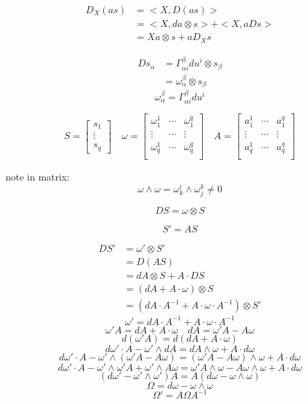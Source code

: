 \documentclass[12pt,a4paper]{article}
\begin{document}
\begin{align*}
D_X(as) & = <X,D(as)> \\
& = <X,da\otimes s> + <X,aDs> \\
& = Xa \otimes s + aD_X s
\end{align*}

\begin{align*}
Ds_{\alpha} & = \Gamma^{\beta}_{\alpha i} du^i \otimes s_{\beta} \\
& = \omega^{\beta}_{\alpha} \otimes s_{\beta}
\end{align*}
\[\omega^{\beta}_{\alpha} = \Gamma^{\beta}_{\alpha i} du^i\]

\[
S = \left[\begin{array}{c}
s_1 \\ \vdots  \\ s_q
\end{array}
\right] \quad
\omega = \left[\begin{array}{ccc}
\omega_1^1 & \cdots  & \omega_1^q \\
\vdots &\cdots & \vdots \\
\omega_q^1 & \cdots & \omega_q^q \\
\end{array}
\right]
\quad
A= \left[\begin{array}{ccc}
a_1^1 & \cdots  & a_1^q \\
\vdots &\cdots & \vdots \\
a_q^1 & \cdots & a_q^q \\
\end{array}
\right]
\]

note in matrix:
\[
\omega \wedge \omega =\omega^i_k \wedge \omega^k_j\neq 0
\]


\[
DS = \omega \otimes S
\]

\[S' = AS\]

\begin{align*}
DS' & = \omega' \otimes S' \\
 & = D(AS) \\
 & = dA \otimes S + A\cdot DS \\
 & = (dA + A\cdot \omega )\otimes S \\
 & = (dA\cdot A^{-1} + A\cdot \omega \cdot A^{-1})\otimes S'
\end{align*}
\[
\omega' = dA\cdot A^{-1} + A\cdot \omega \cdot A^{-1} 
\]
\[
\omega'A = dA + A\cdot \omega \quad dA = \omega'A - A\omega
\]
\[
d(\omega'A) = d(dA+ A\cdot \omega)
\]
\[
d\omega' \cdot A - \omega' \wedge dA = dA \wedge \omega + A\cdot d\omega
\]
\[
d\omega' \cdot A - \omega' \wedge ( \omega'A - A\omega) = ( \omega'A - A\omega) \wedge \omega + A\cdot d\omega
\]
\[
d\omega' \cdot A - \omega' \wedge \omega'A + \omega' \wedge A\omega = \omega'A  \wedge \omega- A\omega \wedge \omega + A\cdot d\omega
\]
\[
(d\omega' - \omega' \wedge \omega')A= A(d\omega- \omega \wedge \omega)
\]
\[
\Omega = d\omega - \omega \wedge \omega \]
\[
\Omega' = A \Omega A^{-1}
\]
\end{document}
